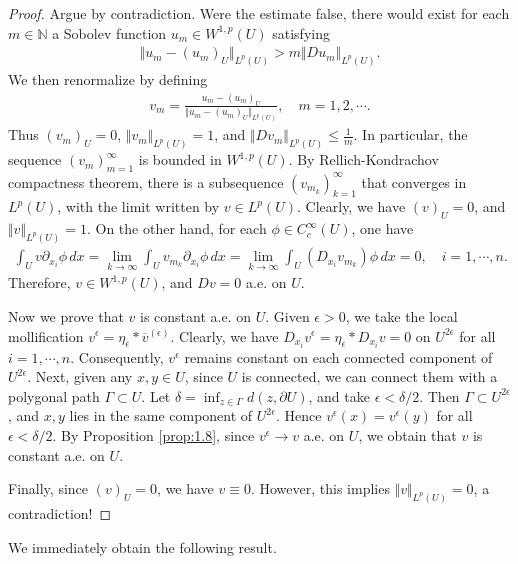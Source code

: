 \documentclass{article}
\numberwithin{equation}{section}
\newcommand{\bbN}{\mathbb{N}}
\newcommand{\ol}{\overline}
\theoremstyle{plain}
\theoremstyle{definition}
\begin{document}
\begin{proof}
Argue by contradiction. Were the estimate false, there would exist for each $m\in\bbN$ a Sobolev function $u_m\in W^{1,p}(U)$ satisfying
\begin{align*}
	\Vert u_m-(u_m)_U\Vert_{L^p(U)}> m\Vert Du_m\Vert_{L^p(U)}.
\end{align*}
We then renormalize by defining
\begin{align*}
	v_m=\frac{u_m-(u_m)_U}{\Vert u_m-(u_m)_U\Vert_{L^p(U)}},\quad m=1,2,\cdots.
\end{align*}
Thus $(v_m)_U=0$, $\Vert v_m\Vert_{L^p(U)}=1$, and $\Vert Dv_m\Vert_{L^p(U)}\leq\frac{1}{m}$. In particular, the sequence $(v_m)_{m=1}^\infty$ is bounded in $W^{1,p}(U)$. By Rellich-Kondrachov compactness theorem, there is a subsequence $(v_{m_k})_{k=1}^\infty$ that converges in $L^p(U)$, with the limit written by $v\in L^p(U)$. Clearly, we have $(v)_U=0$, and $\Vert v\Vert_{L^p(U)}=1$. On the other hand, for each $\phi\in C_c^\infty(U)$, one have
\begin{align*}
	\int_U v\partial_{x_i}\phi\,dx=\lim_{k\to\infty}\int_U v_{m_k}\partial_{x_i}\phi\,dx=\lim_{k\to\infty}\int_U (D_{x_i}v_{m_k})\phi\,dx=0,\quad i=1,\cdots,n.
\end{align*}
Therefore, $v\in W^{1,p}(U)$, and $Dv=0$ a.e. on $U$.

Now we prove that $v$ is constant a.e. on $U$. Given $\epsilon>0$, we take the local mollification $v^\epsilon=\eta_\epsilon*\ol{v}^{(\epsilon)}$. Clearly, we have $D_{x_i}v^\epsilon=\eta_\epsilon*D_{x_i}v=0$ on $U^{2\epsilon}$ for all $i=1,\cdots,n$. Consequently, $v^\epsilon$ remains constant on each connected component of $U^{2\epsilon}$. Next, given any $x,y\in U$, since $U$ is connected, we can connect them with a polygonal path $\Gamma\subset U$. Let $\delta=\inf_{z\in\Gamma}d(z,\partial U)$, and take $\epsilon<\delta/2$. Then $\Gamma\subset U^{2\epsilon}$, and $x,y$ lies in the same component of $U^{2\epsilon}$. Hence $v^\epsilon(x)=v^\epsilon(y)$ for all $\epsilon<\delta/2$. By Proposition \ref{prop:1.8}, since $v^\epsilon\to v$ a.e. on $U$, we obtain that $v$ is constant a.e. on $U$. 

Finally, since $(v)_U=0$, we have $v\equiv 0$. However, this implies $\Vert v\Vert_{L^p(U)}=0$, a contradiction!
\end{proof}

We immediately obtain the following result.
\end{document}
